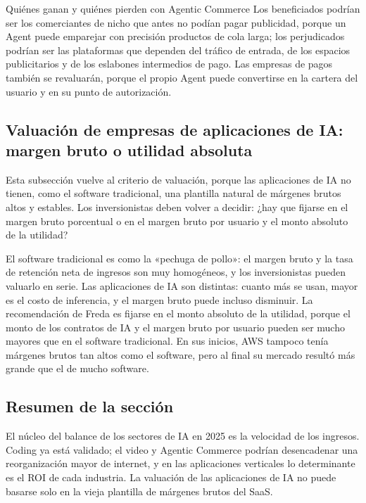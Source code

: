 \begin{importantbox}{Quiénes ganan y quiénes pierden con Agentic Commerce}
Los beneficiados podrían ser los comerciantes de nicho que antes no podían pagar publicidad, porque un Agent puede emparejar con precisión productos de cola larga; los perjudicados podrían ser las plataformas que dependen del tráfico de entrada, de los espacios publicitarios y de los eslabones intermedios de pago. Las empresas de pagos también se revaluarán, porque el propio Agent puede convertirse en la cartera del usuario y en su punto de autorización.
\end{importantbox}

\subsection{Valuación de empresas de aplicaciones de IA: margen bruto o utilidad absoluta}

Esta subsección vuelve al criterio de valuación, porque las aplicaciones de IA no tienen, como el software tradicional, una plantilla natural de márgenes brutos altos y estables. Los inversionistas deben volver a decidir: ¿hay que fijarse en el margen bruto porcentual o en el margen bruto por usuario y el monto absoluto de la utilidad?

El software tradicional es como la «pechuga de pollo»: el margen bruto y la tasa de retención neta de ingresos son muy homogéneos, y los inversionistas pueden valuarlo en serie. Las aplicaciones de IA son distintas: cuanto más se usan, mayor es el costo de inferencia, y el margen bruto puede incluso disminuir. La recomendación de Freda es fijarse en el monto absoluto de la utilidad, porque el monto de los contratos de IA y el margen bruto por usuario pueden ser mucho mayores que en el software tradicional. En sus inicios, AWS tampoco tenía márgenes brutos tan altos como el software, pero al final su mercado resultó más grande que el de mucho software.

\subsection{Resumen de la sección}

El núcleo del balance de los sectores de IA en 2025 es la velocidad de los ingresos. Coding ya está validado; el video y Agentic Commerce podrían desencadenar una reorganización mayor de internet, y en las aplicaciones verticales lo determinante es el ROI de cada industria. La valuación de las aplicaciones de IA no puede basarse solo en la vieja plantilla de márgenes brutos del SaaS.

